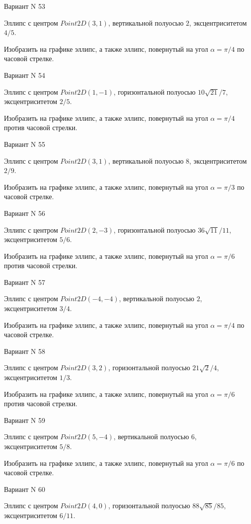\documentclass[11pt]{report}
\begin{document}
Вариант N 53

Эллипс с центром $Point2D\left(3, 1\right)$, вертикальной полуосью $2$, эксцентриситетом $4 / 5$.

    Изобразить на графике эллипс, а также эллипс, повернутый на угол $\alpha = $$\pi / 4$ по часовой стрелке.

Вариант N 54

Эллипс с центром $Point2D\left(1, -1\right)$, горизонтальной полуосью $10 \sqrt{21} / 7$, эксцентриситетом $2 / 5$.

    Изобразить на графике эллипс, а также эллипс, повернутый на угол $\alpha = $$\pi / 4$ против часовой стрелки.

Вариант N 55

Эллипс с центром $Point2D\left(3, 1\right)$, вертикальной полуосью $8$, эксцентриситетом $2 / 9$.

    Изобразить на графике эллипс, а также эллипс, повернутый на угол $\alpha = $$\pi / 3$ по часовой стрелке.

Вариант N 56

Эллипс с центром $Point2D\left(2, -3\right)$, горизонтальной полуосью $36 \sqrt{11} / 11$, эксцентриситетом $5 / 6$.

    Изобразить на графике эллипс, а также эллипс, повернутый на угол $\alpha = $$\pi / 6$ против часовой стрелки.

Вариант N 57

Эллипс с центром $Point2D\left(-4, -4\right)$, вертикальной полуосью $2$, эксцентриситетом $3 / 4$.

    Изобразить на графике эллипс, а также эллипс, повернутый на угол $\alpha = $$\pi / 4$ по часовой стрелке.

Вариант N 58

Эллипс с центром $Point2D\left(3, 2\right)$, горизонтальной полуосью $21 \sqrt{2} / 4$, эксцентриситетом $1 / 3$.

    Изобразить на графике эллипс, а также эллипс, повернутый на угол $\alpha = $$\pi / 6$ против часовой стрелки.

Вариант N 59

Эллипс с центром $Point2D\left(5, -4\right)$, вертикальной полуосью $6$, эксцентриситетом $5 / 8$.

    Изобразить на графике эллипс, а также эллипс, повернутый на угол $\alpha = $$\pi / 6$ по часовой стрелке.

Вариант N 60

Эллипс с центром $Point2D\left(4, 0\right)$, горизонтальной полуосью $88 \sqrt{85} / 85$, эксцентриситетом $6 / 11$.
\end{document}

